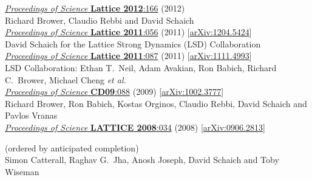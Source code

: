 \begin{spacelistout}
\begin{revnumerate}
      \href{https://doi.org/10.22323/1.164.0166}{\textit{Proceedings of Science} \textbf{Lattice 2012}:166} (2012)
    \pagebreakitem
       \\
      Richard Brower, Claudio Rebbi and David Schaich \\
      \href{https://doi.org/10.22323/1.139.0056}{\textit{Proceedings of Science} \textbf{Lattice 2011}:056} (2011) [\href{http://arxiv.org/abs/1204.5424}{arXiv:1204.5424}]
    \pagebreakitem
       \\
      David Schaich for the Lattice Strong Dynamics (LSD) Collaboration \\
      \href{https://doi.org/10.22323/1.139.0087}{\textit{Proceedings of Science} \textbf{Lattice 2011}:087} (2011) [\href{http://arxiv.org/abs/1111.4993}{arXiv:1111.4993}]
    \pagebreakitem
       \\
      LSD Collaboration: Ethan T.~Neil, Adam Avakian, Ron Babich, Richard C.~Brower, Michael Cheng \textit{et al.} \\ %
      \href{https://doi.org/10.22323/1.086.0088}{\textit{Proceedings of Science} \textbf{CD09}:088} (2009) [\href{http://arxiv.org/abs/1002.3777}{arXiv:1002.3777}]
    \pagebreakitem
       \\
      Richard Brower, Ron Babich, Kostas Orginos, Claudio Rebbi, David Schaich and Pavlos Vranas \\
      \href{https://doi.org/10.22323/1.066.0034}{\textit{Proceedings of Science} \textbf{LATTICE 2008}:034} (2008) [\href{http://arxiv.org/abs/0906.2813}{arXiv:0906.2813}]
  \end{revnumerate}
%
%
%
 \hfill(ordered by anticipated completion)
  \pagebreakitem
     \\
    Simon Catterall, Raghav G.~Jha, Anosh Joseph, David Schaich and Toby Wiseman \\

\end{spacelistout}
